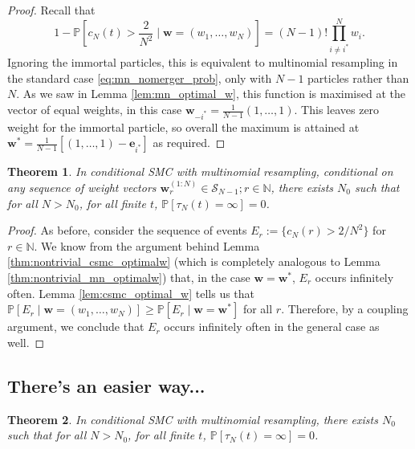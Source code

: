 \documentclass{article}
\newtheorem{thm}{Theorem}
\newcommand{\PR}{\mathbb{P}}
\begin{document}
\begin{proof}
Recall that
\begin{equation*}
1- \PR \left[c_N(t) > \frac{2}{N^2} \mid \mathbf{w}=(w_1, \dots, w_N) \right]
= (N-1)! \prod_{i\neq i^*}^{N} w_i .
\end{equation*}
Ignoring the immortal particles, this is equivalent to multinomial resampling in the standard case \eqref{eq:mn_nomerger_prob}, only with $N-1$ particles rather than $N$. 
As we saw in Lemma \ref{lem:mn_optimal_w}, this function is maximised at the vector of equal weights, in this case $\mathbf{w}_{-i^*}=\frac{1}{N-1} (1,\dots,1)$. 
This leaves zero weight for the immortal particle, so overall the maximum is attained at $\mathbf{w}^*=\frac{1}{N-1} \left[ (1,\dots,1) - \mathbf{e}_{i^*} \right]$ as required.
\end{proof}


\begin{thm}
In conditional SMC with multinomial resampling, conditional on any sequence of weight vectors $\mathbf{w}_r^{(1:N)} \in \mathcal{S}_{N-1}; r\in\mathbb{N}$, there exists $N_0$ such that for all $N>N_0$, for all finite $t$, $\PR[\tau_N(t) = \infty] =0$.
\end{thm}

\begin{proof}
As before, consider the sequence of events 
$E_r := \{ c_N(r) > 2/N^2 \}$ for $r \in \mathbb{N}$.
We know from the argument behind Lemma \ref{thm:nontrivial_csmc_optimalw} (which is completely analogous to Lemma \ref{thm:nontrivial_mn_optimalw}) that, in the case $\mathbf{w}=\mathbf{w}^*$, $E_r$ occurs infinitely often. Lemma \ref{lem:csmc_optimal_w} tells us that 
$\PR[E_r \mid \mathbf{w}=(w_1, \dots, w_N)] \geq \PR[E_r \mid \mathbf{w}=\mathbf{w}^*]$
for all $r$. 
Therefore, by a coupling argument, we conclude that $E_r$ occurs infinitely often in the general case as well.
\end{proof}


\subsection*{There's an easier way...}

\begin{thm}
In conditional SMC with multinomial resampling, there exists $N_0$ such that for all $N>N_0$, for all finite $t$, $\PR[\tau_N(t) = \infty] =0$.
\end{thm}
\end{document}

